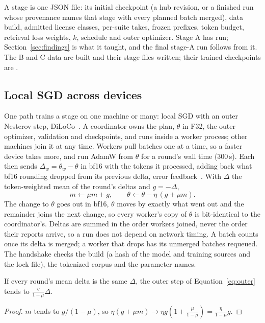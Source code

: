 A stage is one JSON file: its initial checkpoint (a hub revision, or a finished
run whose provenance names that stage with every planned batch merged), data
build, admitted license classes, per-suite takes, frozen prefixes, token
budget, retrieval loss weights, $k$, schedule and outer optimizer. Stage A has
run; Section~\ref{sec:findings} is what it taught, and the final stage-A run
follows from it. The B and C data are built and their stage files written;
their trained checkpoints are \proposed.

\subsection{Local SGD across devices}
\label{sec:cluster}

One path trains a stage on one machine or many: local SGD with an outer
Nesterov step, DiLoCo~\cite{douillard2023diloco}. A coordinator owns the plan,
$\theta$ in F32, the outer optimizer, validation and checkpoints, and runs
inside a worker process; other machines join it at any time. Workers pull
batches one at a time, so a faster device takes more, and run AdamW from
$\theta$ for a round's wall time (300\,s). Each then sends
$\Delta_w = \theta_w - \theta$ in bf16 with the tokens it processed, adding
back what bf16 rounding dropped from its previous delta, error
feedback~\cite{seide2014onebit,karimireddy2019ef}. With $\Delta$ the
token-weighted mean of the round's deltas and $g = -\Delta$,
\begin{equation}
  m \leftarrow \mu m + g, \qquad \theta \leftarrow \theta - \eta\,(g + \mu m).
  \label{eq:outer}
\end{equation}
The change to $\theta$ goes out in bf16, $\theta$ moves by exactly what went out
and the remainder joins the next change, so every worker's copy of $\theta$ is
bit-identical to the coordinator's. Deltas are summed in the order workers
joined, never the order their reports arrive, so a run does not depend on
network timing. A batch counts once its delta is merged; a worker that drops
has its unmerged batches requeued. The handshake checks the build (a hash of
the model and training sources and the lock file), the tokenized corpus and the
parameter names.

\begin{proposition}
\label{prop:outer}
If every round's mean delta is the same $\Delta$, the outer step of
Equation~\eqref{eq:outer} tends to $\frac{\eta}{1-\mu}\Delta$.
\end{proposition}
\begin{proof}
$m$ tends to $g/(1-\mu)$, so $\eta(g + \mu m) \to \eta g (1 + \frac{\mu}{1-\mu})
= \frac{\eta}{1-\mu} g$.
\end{proof}

